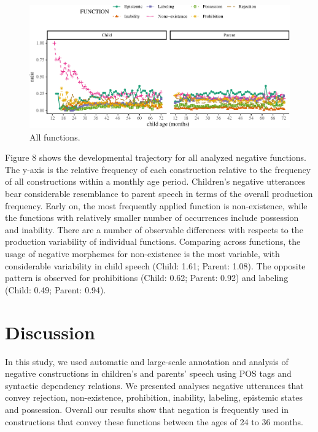 \documentclass[10pt, letterpaper]{article}
\newenvironment{CodeChunk}{}{}
\begin{document}
\begin{figure}[h]
\begin{CodeChunk}


\begin{center}\includegraphics{figs/all-1} \end{center}

\end{CodeChunk}
\caption[This image spans both columns]{All functions.}\label{fig:all}
\end{figure}

Figure 8 shows the developmental trajectory for all analyzed negative
functions. The y-axis is the relative frequency of each construction
relative to the frequency of all constructions within a monthly age
period. Children's negative utterances bear considerable resemblance to
parent speech in terms of the overall production frequency. Early on,
the most frequently applied function is non-existence, while the
functions with relatively smaller number of occurrences include
possession and inability. There are a number of observable differences
with respects to the production variability of individual functions.
Comparing across functions, the usage of negative morphemes for
non-existence is the most variable, with considerable variability in
child speech (Child: 1.61; Parent: 1.08). The opposite pattern is
observed for prohibitions (Child: 0.62; Parent: 0.92) and labeling
(Child: 0.49; Parent: 0.94).

\hypertarget{discussion}{%
\section{Discussion}\label{discussion}}

In this study, we used automatic and large-scale annotation and analysis
of negative constructions in children's and parents' speech using POS
tags and syntactic dependency relations. We presented analyses negative
utterances that convey rejection, non-existence, prohibition, inability,
labeling, epistemic states and possession. Overall our results show that
negation is frequently used in constructions that convey these functions
between the ages of 24 to 36 months.
\end{document}
